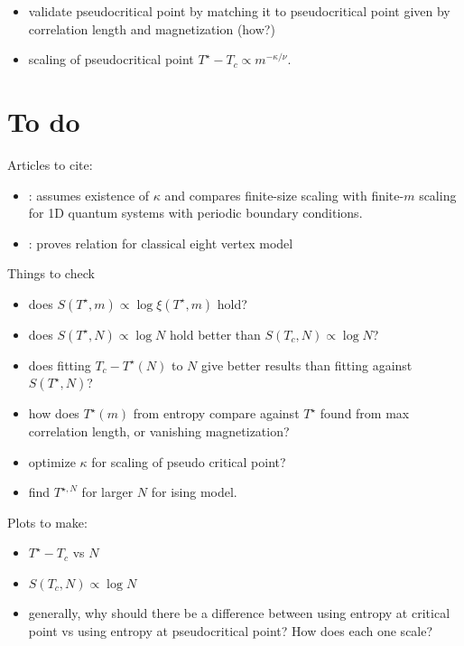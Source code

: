 

\begin{itemize}
  \item validate pseudocritical point by matching it to pseudocritical point given by correlation length and
  magnetization (how?)
  \item scaling of pseudocritical point $T^{\star} - T_c \propto m^{-\kappa / \nu}$.
\end{itemize}

\section{To do}

Articles to cite:

\begin{itemize}
\item \cite{pirvu2012matrix}: assumes existence of $\kappa$ and compares finite-size scaling with finite-$m$ scaling
for 1D quantum systems with periodic boundary conditions.
\item \cite{ercolessi2010exact}: proves relation for classical eight vertex model
\end{itemize}

Things to check

\begin{itemize}
  \item does $S(T^{\star}, m) \propto \log \xi(T^{\star}, m)$ hold?
  \item does $S(T^{\star}, N) \propto \log N$ hold better than $S(T_c, N) \propto \log N$?
  \item does fitting $T_c - T^{\star}(N)$ to $N$ give better results than fitting against
  $S(T^{\star}, N)$?
  \item how does $T^{\star}(m)$ from entropy compare against $T^{\star}$ found from max correlation length, or
  vanishing magnetization?
  \item optimize $\kappa$ for scaling of pseudo critical point?
  \item find $T^{\star, N}$ for larger $N$ for ising model.

\end{itemize}

Plots to make:

\begin{itemize}
  \item $T^{\star} - T_c$ vs $N$
  \item $S(T_c, N) \propto \log N$
  \item generally, why should there be a difference between using entropy at critical point
  vs using entropy at pseudocritical point? How does each one scale?
\end{itemize}
